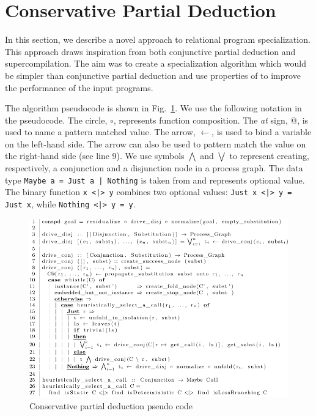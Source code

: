 \newcommand{\code}[1]{\texttt{#1}}

\section{Conservative Partial Deduction}
\label{conspd}

In this section, we describe a novel approach to relational program specialization.
This approach draws inspiration from both conjunctive partial deduction and supercompilation.
The aim was to create a specialization algorithm which would be simpler than conjunctive partial deduction and use properties of \mk to improve the performance of the input programs.

The algorithm pseudocode is shown in Fig.~\ref{fig:ncpd-pseudo}.
We use the following notation in the pseudocode.
The circle, $\circ$, represents function composition.
The \emph{at} sign, @, is used to name a pattern matched value.
The arrow, $\leftarrow$, is used to bind a variable on the left-hand side.
The arrow can also be used to pattern match the value on the right-hand side (see line 9).
We use symbols $\bigwedge$ and $\bigvee$ to represent creating, respectively, a conjunction and a disjunction node in a process graph.
The data type \code{Maybe a = Just a | Nothing} is taken from \haskell and represents optional value.
The binary function \verb!x <|> y! combines two optional values: \verb!Just x <|> y = Just x!, while \verb!Nothing <|> y = y!.


\begin{figure}[!t]
  \centering
  \includegraphics[width=\textwidth]{figures/algo-pseudo-crop.pdf}
  \caption{Conservative partial deduction pseudo code}
  \label{fig:ncpd-pseudo}
\end{figure}


